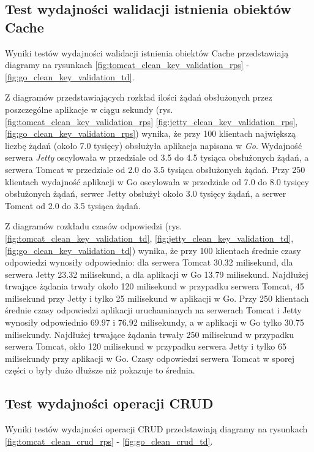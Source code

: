 % 
\clearpage

\subsection{Test wydajności walidacji istnienia obiektów Cache}
Wyniki testów wydajności walidacji istnienia obiektów Cache przedstawiają diagramy na rysunkach \ref{fig:tomcat_clean_key_validation_rps} - \ref{fig:go_clean_key_validation_td}.              

Z diagramów przedstawiających rozkład ilości żądań obsłużonych przez poszczególne aplikacje w ciągu sekundy  (rys. \ref{fig:tomcat_clean_key_validation_rps} \ref{fig:jetty_clean_key_validation_rps}, \ref{fig:go_clean_key_validation_rps}) wynika, że przy 100 klientach największą liczbę żądań (około 7.0 tysięcy) obsłużyła aplikacja napisana w \textsl{Go}. Wydajność serwera \textsl{Jetty} oscylowała w przedziale od 3.5 do 4.5 tysiąca obsłużonych żądań, a serwera Tomcat w przedziale od 2.0 do 3.5 tysiąca obsłużonych żądań. Przy 250 klientach wydajność aplikacji w Go oscylowała w przedziale od 7.0 do 8.0 tysięcy obsłużonych żądań, serwer Jetty obsłużył około 3.0 tysięcy żądań, a serwer Tomcat od 2.0 do 3.5 tysiąca żądań.

Z diagramów rozkładu czasów odpowiedzi (rys. \ref{fig:tomcat_clean_key_validation_td}, \ref{fig:jetty_clean_key_validation_td}, \ref{fig:go_clean_key_validation_td}) wynika, że przy 100 klientach średnie czasy odpowiedzi wynosiły odpowiednio: dla serwera Tomcat 30.32 milisekund, dla serwera Jetty 23.32 milisekund, a dla aplikacji w Go 13.79 milisekund. Najdłużej trwające żądania trwały około 120 milisekund w przypadku serwera Tomcat, 45 milisekund przy Jetty i tylko 25 milisekund w aplikacji w Go. Przy 250 klientach średnie czasy odpowiedzi aplikacji uruchamianych na serwerach Tomcat i Jetty wynosiły odpowiednio 69.97 i 76.92 milisekundy, a w aplikacji w Go tylko 30.75 milisekundy. Najdłużej trwające żądania trwały 250 milisekund w przypadku serwera Tomcat, okło 120 milisekund w przypadku serwera Jetty i tylko 65 milisekundy przy aplikacji w Go. Czasy odpowiedzi serwera Tomcat w sporej części o były dużo dłuższe niż pokazuje to średnia.

% 
\clearpage

\subsection{Test wydajności operacji CRUD}
Wyniki testów wydajności operacji CRUD przedstawiają diagramy na rysunkach \ref{fig:tomcat_clean_crud_rps} - \ref{fig:go_clean_crud_td}.


